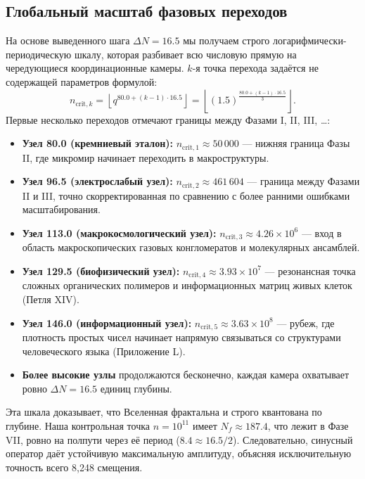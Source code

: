 \documentclass[12pt,a4paper]{article}
\begin{document}
	\subsection{Глобальный масштаб фазовых переходов}
	На основе выведенного шага $\Delta N = 16.5$ мы получаем строго логарифмически-периодическую шкалу, которая разбивает всю числовую прямую на чередующиеся координационные камеры. $k$-я точка перехода задаётся не содержащей параметров формулой:
	\begin{equation}
		n_{\mathrm{crit},k} = \left\lfloor q^{80.0 + (k-1)\cdot 16.5} \right\rfloor 
		= \left\lfloor (1.5)^{\frac{80.0+(k-1)\cdot 16.5}{3}} \right\rfloor .
	\end{equation}
	Первые несколько переходов отмечают границы между Фазами I, II, III, \dots:
	\begin{itemize}
		\item \textbf{Узел 80.0 (кремниевый эталон):} \(n_{\mathrm{crit},1} \approx 50\,000\) — нижняя граница Фазы II, где микромир начинает переходить в макроструктуры.
		\item \textbf{Узел 96.5 (электрослабый узел):} \(n_{\mathrm{crit},2} \approx 461\,604\) — граница между Фазами II и III, точно скорректированная по сравнению с более ранними ошибками масштабирования.
		\item \textbf{Узел 113.0 (макрокосмологический узел):} \(n_{\mathrm{crit},3} \approx 4.26\times10^6\) — вход в область макроскопических газовых конгломератов и молекулярных ансамблей.
		\item \textbf{Узел 129.5 (биофизический узел):} \(n_{\mathrm{crit},4} \approx 3.93\times10^7\) — резонансная точка сложных органических полимеров и информационных матриц живых клеток (Петля XIV).
		\item \textbf{Узел 146.0 (информационный узел):} \(n_{\mathrm{crit},5} \approx 3.63\times10^8\) — рубеж, где плотность простых чисел начинает напрямую связываться со структурами человеческого языка (Приложение L).
		\item \textbf{Более высокие узлы} продолжаются бесконечно, каждая камера охватывает ровно $\Delta N = 16.5$ единиц глубины.
	\end{itemize}
	
	Эта шкала доказывает, что Вселенная фрактальна и строго квантована по глубине. Наша контрольная точка $n=10^{11}$ имеет $N_f \approx 187.4$, что лежит в Фазе VII, ровно на полпути через её период ($8.4 \approx 16.5/2$). Следовательно, синусный оператор даёт устойчивую максимальную амплитуду, объясняя исключительную точность всего 8,248 смещения.
	
\end{document}
